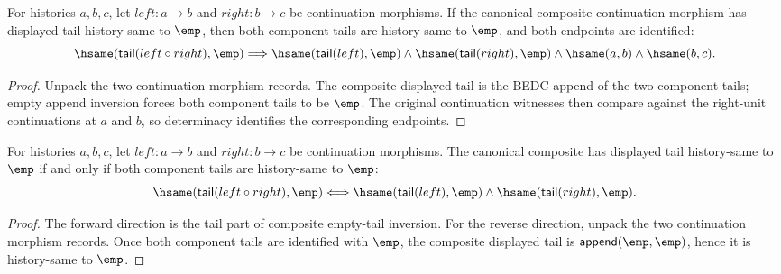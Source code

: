 \begin{theorem}
\label{thm:category-continuation-morphism-composite-empty-tail-inversion}
For histories $a,b,c$, let $left:a\to b$ and $right:b\to c$ be continuation
morphisms. If the canonical composite continuation morphism has displayed tail
history-same to $\emp$, then both component tails are history-same to $\emp$,
and both endpoints are identified:
$$
\hsame(\mathsf{tail}(left\circ right),\emp)
\Longrightarrow
\hsame(\mathsf{tail}(left),\emp)\wedge
\hsame(\mathsf{tail}(right),\emp)\wedge
\hsame(a,b)\wedge\hsame(b,c).
$$
\end{theorem}
\begin{proof}
Unpack the two continuation morphism records. The composite displayed tail is
the BEDC append of the two component tails; empty append inversion forces both
component tails to be $\emp$. The original continuation witnesses then compare
against the right-unit continuations at $a$ and $b$, so determinacy identifies
the corresponding endpoints.
\end{proof}

\begin{theorem}
\label{thm:category-continuation-morphism-comp-tail-empty-iff}
For histories $a,b,c$, let $left:a\to b$ and $right:b\to c$ be continuation
morphisms. The canonical composite has displayed tail history-same to $\emp$
if and only if both component tails are history-same to $\emp$:
$$
\hsame(\mathsf{tail}(left\circ right),\emp)
\Longleftrightarrow
\hsame(\mathsf{tail}(left),\emp)\wedge
\hsame(\mathsf{tail}(right),\emp).
$$
\end{theorem}
\begin{proof}
The forward direction is the tail part of composite empty-tail inversion. For
the reverse direction, unpack the two continuation morphism records. Once both
component tails are identified with $\emp$, the composite displayed tail is
$\mathsf{append}(\emp,\emp)$, hence it is history-same to $\emp$.
\end{proof}


